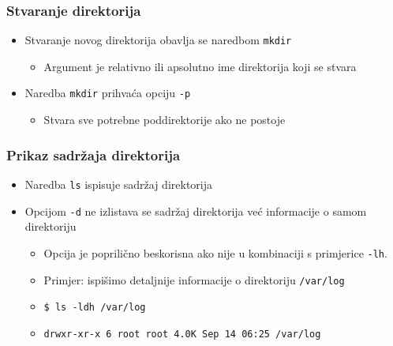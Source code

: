 \documentclass{beamer}
\begin{document}
\begin{frame}[t]
\frametitle{Stvaranje direktorija}
\begin{itemize}
  \item Stvaranje novog direktorija obavlja se naredbom \texttt{mkdir}
  \begin{itemize}
    \item Argument je relativno ili apsolutno ime direktorija koji se
          stvara
  \end{itemize}
  \item Naredba \texttt{mkdir} prihvaća opciju \texttt{-p}
  \begin{itemize}
    \item Stvara sve potrebne poddirektorije ako ne postoje
  \end{itemize}
\end{itemize}
\end{frame}

\begin{frame}[t]
\frametitle{Prikaz sadržaja direktorija}
\begin{itemize}
  \item Naredba \texttt{ls} ispisuje sadržaj direktorija
  \item Opcijom \texttt{-d} ne izlistava se sadržaj direktorija već
        informacije o samom direktoriju
  \begin{itemize}
    \item Opcija je poprilično beskorisna ako nije u kombinaciji s primjerice
        \texttt{-lh}.
    \item Primjer: ispišimo detaljnije informacije o direktoriju \texttt{/var/log}
        \hspace{5ex}
    \item[] \texttt{\$ ls -ldh /var/log}
    \item[] \texttt{drwxr-xr-x 6 root root 4.0K Sep 14 06:25 /var/log}
  \end{itemize}
\end{itemize}
\end{frame}
\end{document}
